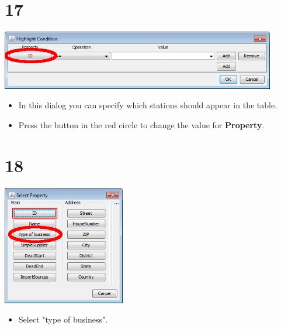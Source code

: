 \documentclass[10pt]{beamer}
\begin{document}
\section{17}
\begin{frame}
	\begin{center}
  		\includegraphics[width=0.9\textwidth]{17.png}
	\end{center}
	\begin{itemize}
		\item In this dialog you can specify which stations should appear in the table.
		\item Press the button in the red circle to change the value for \textbf{Property}.
	\end{itemize}
\end{frame}

\section{18}
\begin{frame}
	\begin{center}
  		\includegraphics[width=0.4\textwidth]{18.png}
	\end{center}
	\begin{itemize}
		\item Select "type of business".
	\end{itemize}
\end{frame}
\end{document}
